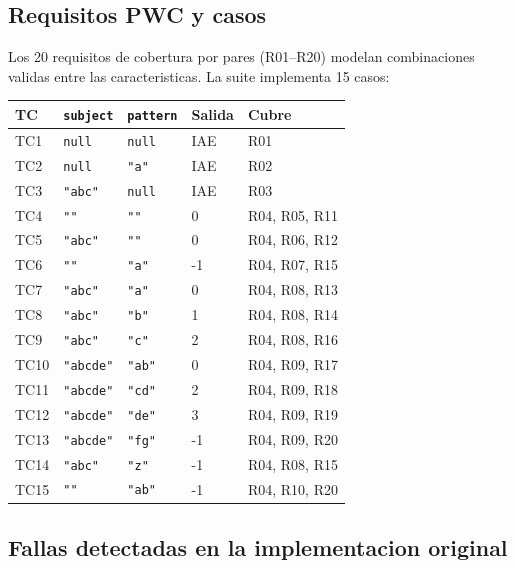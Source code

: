 \documentclass[12pt,a4paper]{article}
\begin{document}
\subsection{Requisitos PWC y casos}

Los 20 requisitos de cobertura por pares (R01--R20) modelan combinaciones validas entre las
caracteristicas. La suite implementa 15 casos:

\begin{longtable}{@{}p{1cm}p{2.5cm}p{2.5cm}p{1.5cm}p{4cm}@{}}
\toprule
\textbf{TC} & \texttt{subject} & \texttt{pattern} & \textbf{Salida} & \textbf{Cubre} \\
\midrule
\endhead
TC1  & \texttt{null}     & \texttt{null}     & IAE & R01 \\
TC2  & \texttt{null}     & \texttt{"a"}      & IAE & R02 \\
TC3  & \texttt{"abc"}    & \texttt{null}     & IAE & R03 \\
TC4  & \texttt{""}       & \texttt{""}       & 0   & R04, R05, R11 \\
TC5  & \texttt{"abc"}    & \texttt{""}       & 0   & R04, R06, R12 \\
TC6  & \texttt{""}       & \texttt{"a"}      & -1  & R04, R07, R15 \\
TC7  & \texttt{"abc"}    & \texttt{"a"}      & 0   & R04, R08, R13 \\
TC8  & \texttt{"abc"}    & \texttt{"b"}      & 1   & R04, R08, R14 \\
TC9  & \texttt{"abc"}    & \texttt{"c"}      & 2   & R04, R08, R16 \\
TC10 & \texttt{"abcde"}  & \texttt{"ab"}     & 0   & R04, R09, R17 \\
TC11 & \texttt{"abcde"}  & \texttt{"cd"}     & 2   & R04, R09, R18 \\
TC12 & \texttt{"abcde"}  & \texttt{"de"}     & 3   & R04, R09, R19 \\
TC13 & \texttt{"abcde"}  & \texttt{"fg"}     & -1  & R04, R09, R20 \\
TC14 & \texttt{"abc"}    & \texttt{"z"}      & -1  & R04, R08, R15 \\
TC15 & \texttt{""}       & \texttt{"ab"}     & -1  & R04, R10, R20 \\
\bottomrule
\end{longtable}

\subsection{Fallas detectadas en la implementacion original}
\end{document}
